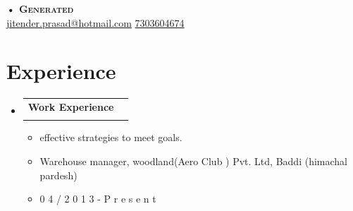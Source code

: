\documentclass[letterpaper,11pt]{article}
\makeatletter
\newcommand{\resumeItem}[1]{
  \item\small{
    {#1 \vspace{-2pt}}
  }
}
\newcommand{\resumeSubheading}[4]{
  \vspace{-2pt}\item
    \begin{tabular*}{0.97\textwidth}[t]{l@{\extracolsep{\fill}}r}
      \textbf{#1} & #2 \\
      \textit{\small#3} & \textit{\small #4} \\
    \end{tabular*}\vspace{-7pt}
}
\newcommand{\resumeSubHeadingListStart}{\begin{itemize}[leftmargin=0.15in, label={}]}
\newcommand{\resumeSubHeadingListEnd}{\end{itemize}}
\newcommand{\resumeItemListStart}{\begin{itemize}}
\newcommand{\resumeItemListEnd}{\end{itemize}\vspace{-8pt}}
\makeatother
\begin{document}
\begin{center}
    \textbf{\Huge \scshape • Generated} \\ \vspace{8pt}
    \small 
    \href{mailto:jitender.prasad@hotmail.com}{\color{black}jitender.prasad@hotmail.com} \hspace{5px}
    \href{tel:7303604674}{\color{black}7303604674}
\end{center}

\vspace{-8pt}

\section{Experience}
  \resumeSubHeadingListStart

   \resumeSubheading
    {Work Experience}{}
    {}{}
    \resumeItemListStart
        \resumeItem{effective strategies to meet goals.}
        \resumeItem{Warehouse manager, woodland(Aero Club ) Pvt. Ltd, Baddi (himachal pardesh)}
        \resumeItem{0 4 / 2 0 1 3   -  P r e s e n t}
    \resumeItemListEnd

  \resumeSubHeadingListEnd
\end{document}
